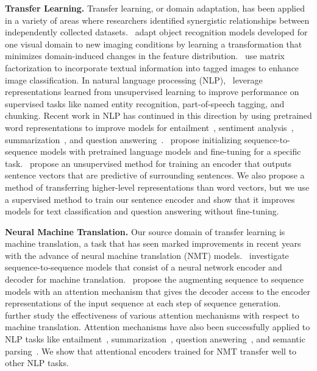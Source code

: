 \documentclass{article}
\begin{document}
\textbf{Transfer Learning.}
Transfer learning, or domain adaptation, has been applied in a variety of areas where researchers identified synergistic relationships between independently collected datasets.~\citet{Saenko2010AdaptingVC} 
adapt object recognition models developed for one visual domain to new imaging conditions by learning a transformation that minimizes domain-induced changes in the feature distribution.~\citet{Zhu2011HeterogeneousTL}
use matrix factorization to incorporate textual information into tagged images to enhance image classification.
In natural language processing (NLP),~\citet{Collobert2011} leverage representations learned from unsupervised learning to improve performance on supervised tasks like named entity recognition, part-of-speech tagging, and chunking.
Recent work in NLP has continued in this direction by using pretrained word representations to improve models for
entailment~\citep{Bowman2014},
sentiment analysis~\citep{Socher2013EMNLP},
summarization~\citep{Nallapati2016AbstractiveTS},
and question answering~\citep{Seo2017BidirectionalAF,Xiong2017}.~\citet{Ramachandran2016UnsupervisedPF} propose initializing sequence-to-sequence models with pretrained language models and fine-tuning for a specific task.~\citet{Kiros2015SkipThoughtV} propose an unsupervised method for training an encoder that outputs sentence vectors that are predictive of surrounding sentences.
We also propose a method of transferring higher-level representations than word vectors, but we use a supervised method to train our sentence encoder and show that it improves models for text classification and question answering without fine-tuning.

\textbf{Neural Machine Translation.} 
Our source domain of transfer learning is machine translation, 
a task that has seen marked improvements in recent years with the advance of neural machine translation (NMT) models.~\citet{Sutskever2014} investigate sequence-to-sequence models that consist of a neural network encoder and decoder for machine translation.~\citet{Bahdanau2015} propose the augmenting sequence to sequence models with an attention mechanism that gives the decoder access to the encoder representations of the input sequence at each step of sequence generation.~\citet{Luong2015EffectiveAT} further study the effectiveness of various attention mechanisms with respect to machine translation.
Attention mechanisms have also been successfully applied to NLP tasks like
entailment~\citep{conneau2017supervised},
summarization~\citep{Nallapati2016AbstractiveTS},
question answering~\citep{Seo2017BidirectionalAF,Xiong2017,min2017question},
and semantic parsing~\citep{Dong2016LanguageTL}.
We show that attentional encoders trained for NMT transfer well to other NLP tasks.
\end{document}
